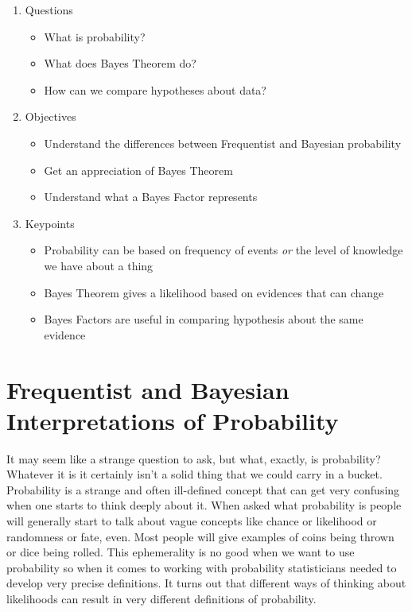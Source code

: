 \documentclass[
]{book}
\providecommand{\tightlist}{%
  \setlength{\itemsep}{0pt}\setlength{\parskip}{0pt}}
\begin{document}
\begin{enumerate}
\def\labelenumi{\arabic{enumi}.}
\tightlist
\item
  Questions

  \begin{itemize}
  \tightlist
  \item
    What is probability?
  \item
    What does Bayes Theorem do?
  \item
    How can we compare hypotheses about data?
  \end{itemize}
\item
  Objectives

  \begin{itemize}
  \tightlist
  \item
    Understand the differences between Frequentist and Bayesian probability
  \item
    Get an appreciation of Bayes Theorem
  \item
    Understand what a Bayes Factor represents
  \end{itemize}
\item
  Keypoints

  \begin{itemize}
  \tightlist
  \item
    Probability can be based on frequency of events \emph{or} the level of knowledge we have about a thing
  \item
    Bayes Theorem gives a likelihood based on evidences that can change
  \item
    Bayes Factors are useful in comparing hypothesis about the same evidence
  \end{itemize}
\end{enumerate}

\hypertarget{frequentist-and-bayesian-interpretations-of-probability}{%
\section{Frequentist and Bayesian Interpretations of Probability}\label{frequentist-and-bayesian-interpretations-of-probability}}

It may seem like a strange question to ask, but what, exactly, is probability? Whatever it is it certainly isn't a solid thing that we could carry in a bucket. Probability is a strange and often ill-defined concept that can get very confusing when one starts to think deeply about it. When asked what probability is people will generally start to talk about vague concepts like chance or likelihood or randomness or fate, even. Most people will give examples of coins being thrown or dice being rolled. This ephemerality is no good when we want to use probability so when it comes to working with probability statisticians needed to develop very precise definitions. It turns out that different ways of thinking about likelihoods can result in very different definitions of probability.
\end{document}
